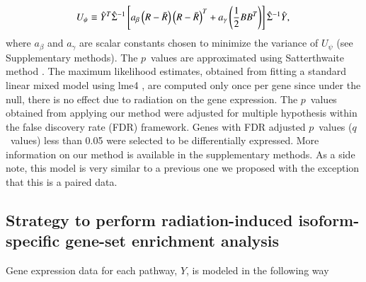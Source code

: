 \documentclass[hidelinks,11pt]{article}
\begin{document}
\begin{equation}
U_\psi \equiv \hat{Y}^T  \hat{\Sigma}^{-1} \left[ a_\beta \left(R - \bar{R} \right) \left(R - \bar{R} \right)^T   + a_\gamma \left( \frac{1}{2} B B^T \right) \right]  \hat{\Sigma}^{-1} \hat{Y}, \\
\end{equation}
where ${a_\beta}$ and ${a_\gamma}$ are scalar constants chosen to minimize the variance of $U_\psi$ (see Supplementary methods). The $p$~values are approximated using Satterthwaite method \cite{satterthwaite}. The maximum likelihood estimates, obtained from fitting a standard linear mixed model using lme4 \cite{lme4}, are computed only once per gene since under the null, there is no effect due to radiation on the gene expression. The $p$~values obtained from applying our method were adjusted for multiple hypothesis within the false discovery rate (FDR) framework. Genes with FDR adjusted $p$~values ($q$~values) less than 0.05 were selected to be differentially expressed. More information on our method is available in the supplementary methods. As a side note, this model is very similar to a previous one we proposed \cite{jaguar} with the exception that this is a paired data. 

\subsection*{Strategy to perform radiation-induced isoform-specific gene-set enrichment analysis}

Gene expression data for each pathway, $Y$, is modeled in the following way 
\end{document}
